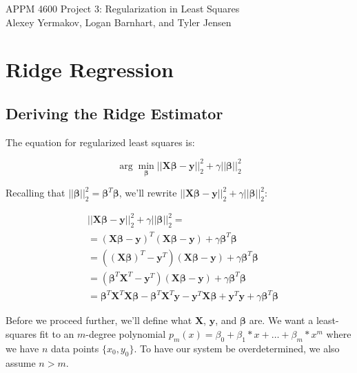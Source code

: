 \documentclass{article}
\newcommand{\y}{\mathbf{y}}
\newcommand{\X}{\mathbf{X}}
\newcommand{\B}{\boldsymbol\beta} %
\begin{document}
APPM 4600 Project 3: Regularization in Least Squares\\
Alexey Yermakov, Logan Barnhart, and Tyler Jensen

\section{Ridge Regression}
\subsection{Deriving the Ridge Estimator}

The equation for regularized least squares is:

\begin{equation} \label{eqn:rls}
    \arg \min_{\B} ||\X\B-\y||_{2}^{2} + \gamma||\B||_{2}^{2}
\end{equation}

Recalling that $||\B||_{2}^{2}=\B^T \B$, we'll rewrite $||\X\B-\y||_{2}^{2} + \gamma||\B||_{2}^{2}$:

\begin{equation*}
\begin{split}
    & ||\X\B-\y||_{2}^{2} + \gamma||\B||_{2}^{2} =\\
    & =  (\X\B - \y)^T (\X\B - \y) + \gamma \B^T \B \\ 
    & =  ((\X\B)^T - \y^T) (\X\B - \y) + \gamma \B^T \B \\ 
    & =  (\B^T\X^T - \y^T) (\X\B - \y) + \gamma \B^T \B \\ 
    & = \B^T \X^T \X\B - \B^T \X^T \y - \y^T \X\B + \y^T \y + \gamma \B^T \B
\end{split}
\end{equation*}

Before we proceed further, we'll define what $\X$, $\y$, and $\B$ are. We want a least-squares fit to an $m$-degree polynomial $p_m(x)=\beta_0+\beta_1*x+\ldots+\beta_m*x^m$ where we have $n$ data points $\{x_0,y_0\}$. To have our system be overdetermined, we also assume $n > m$.
\end{document}
